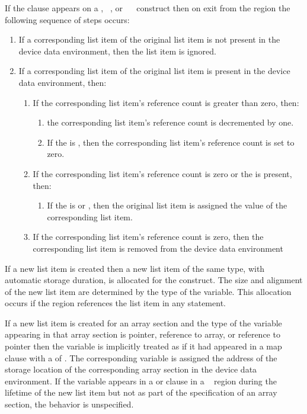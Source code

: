 If the  clause appears on a , ~, or ~~ construct then on exit from the region the following sequence of steps occurs:
\begin{enumerate}
\item If a corresponding list item of the original list item is not present in the device data environment, then the list item is ignored.
\item If a corresponding list item of the original list item is present in the device data environment, then:
\begin{enumerate}
\item If the corresponding list item's reference count is greater than zero, then:
\begin{enumerate}
\item the corresponding list item's reference count is decremented by one.
\item If the  is , then the corresponding list item's reference count is set to zero. 
\end{enumerate}
\item If the corresponding list item's reference count is zero or the   is present, then:
\begin{enumerate}
\item If the  is  or , then the original list item is assigned the value of the corresponding list item. 
\end{enumerate}
\item If the corresponding list item's reference count is zero, then the corresponding list item is removed from the device data environment 
\end{enumerate}
\end{enumerate}

\ccppspecificstart
If a new list item is created then a new list item of the same type, with automatic storage
duration, is allocated for the construct. The size and alignment of the new list
item are determined by the type of the variable. This allocation occurs if the region
references the list item in any statement.

If a new list item is created for an array section and the type of the variable appearing in that array section is pointer, reference to array, or reference to pointer then the variable is implicitly treated as if it had appeared in a map clause with a  of . The corresponding variable is assigned the address of the storage location of the corresponding array section in the device data environment. If the variable appears in a  or  clause in a ~ region during the lifetime of the new list item but not as part of the specification of an array section, the behavior is unspecified. 
\ccppspecificend

